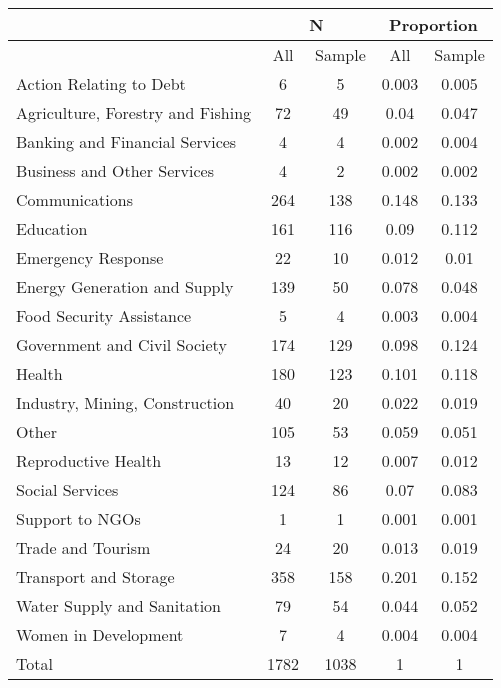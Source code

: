  \begin{tabular}{l cc cc}  & \multicolumn{2}{c}{N} & \multicolumn{2}{c}{Proportion} \\  \hline  & All & Sample & All & Sample \\ \hline Action Relating to Debt  &  6  &  5  &  0.003  &  0.005  \\ 
 Agriculture, Forestry and Fishing  &  72  &  49  &  0.04  &  0.047  \\ 
 Banking and Financial Services  &  4  &  4  &  0.002  &  0.004  \\ 
 Business and Other Services  &  4  &  2  &  0.002  &  0.002  \\ 
 Communications  &  264  &  138  &  0.148  &  0.133  \\ 
 Education  &  161  &  116  &  0.09  &  0.112  \\ 
 Emergency Response  &  22  &  10  &  0.012  &  0.01  \\ 
 Energy Generation and Supply  &  139  &  50  &  0.078  &  0.048  \\ 
 Food Security Assistance  &  5  &  4  &  0.003  &  0.004  \\ 
 Government and Civil Society  &  174  &  129  &  0.098  &  0.124  \\ 
 Health  &  180  &  123  &  0.101  &  0.118  \\ 
 Industry, Mining, Construction  &  40  &  20  &  0.022  &  0.019  \\ 
 Other  &  105  &  53  &  0.059  &  0.051  \\ 
 Reproductive Health  &  13  &  12  &  0.007  &  0.012  \\ 
 Social Services  &  124  &  86  &  0.07  &  0.083  \\ 
 Support to NGOs  &  1  &  1  &  0.001  &  0.001  \\ 
 Trade and Tourism  &  24  &  20  &  0.013  &  0.019  \\ 
 Transport and Storage  &  358  &  158  &  0.201  &  0.152  \\ 
 Water Supply and Sanitation  &  79  &  54  &  0.044  &  0.052  \\ 
 Women in Development  &  7  &  4  &  0.004  &  0.004  \\ 
  \hline Total &  1782  &  1038  &  1 & 1 \\ \hline  \end{tabular} 